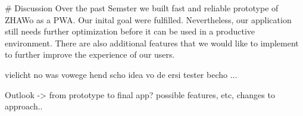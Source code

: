 \begin{markdown}

# Discussion
Over the past Semster we built fast and reliable prototype of ZHAWo as a PWA. Our inital goal were fulfilled. Nevertheless, our application still needs further optimization before it can be used in a productive environment. There are also additional features that we would like to implement to further improve the experience of our users.

vielicht no was vowege hend scho idea vo de ersi tester becho ...

Outlook -> from prototype to final app? possible features, etc, changes to approach..

\end{markdown}
